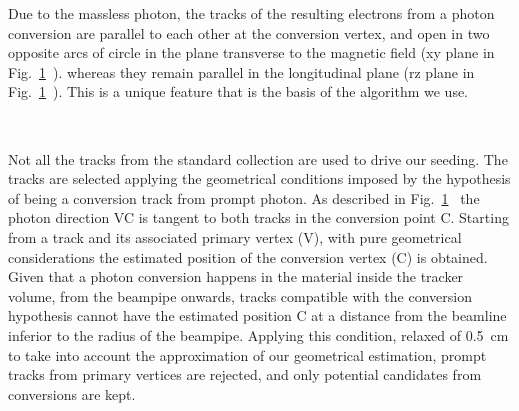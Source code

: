 \documentclass[a4paper]{jpconf}
\begin{document}
Due to the massless photon, the tracks of the resulting electrons from a photon conversion are parallel to each other at the conversion vertex, and open in two opposite arcs of circle in the  plane transverse to the magnetic field (xy plane in Fig.~\ref{fig:algo}~).
whereas they  remain parallel in the  longitudinal plane (rz plane in Fig.~\ref{fig:algo}~). This is a unique feature that is the basis of the algorithm we use. 


\begin{figure}[]
\centering
{}
\caption{~}
\label{fig:algo}
\end{figure}

Not all the tracks from  the standard collection are used to drive our seeding. The tracks are selected applying the geometrical conditions imposed by the hypothesis of being a conversion track from prompt photon. As described in Fig.~\ref{fig:algo}~ the photon direction VC is tangent to both tracks in the conversion point C. Starting from a track and its associated primary vertex (V), with pure geometrical considerations the estimated position of the conversion vertex (C) is obtained. Given that a photon conversion happens in the material inside the tracker volume, from the beampipe onwards, tracks compatible with the conversion hypothesis cannot have the estimated position C at a distance from the beamline inferior to the radius of the beampipe. Applying this condition, relaxed of 0.5~cm to take into account the approximation of our geometrical estimation,  prompt tracks from primary vertices are rejected, and only potential candidates from conversions are kept.
\end{document}
